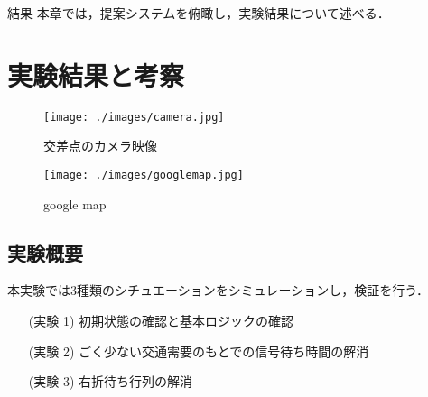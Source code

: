\chapterhead
{結果}
{本章では，提案システムを俯瞰し，実験結果について述べる．}


\section{実験結果と考察}

\begin{figure}[t]
  \texttt{[image: ./images/camera.jpg]}
  \caption{交差点のカメラ映像} 
  \label{tab:camera}
\end{figure}

\begin{figure}[t]
  \texttt{[image: ./images/googlemap.jpg]}
  \caption{google map} 
  \label{tab:googlemap}
\end{figure}

\subsection{実験概要}
本実験では3種類のシチュエーションをシミュレーションし，検証を行う．
\begin{itemize}
  \item[(実験 1)]初期状態の確認と基本ロジックの確認
  \item[(実験 2)]ごく少ない交通需要のもとでの信号待ち時間の解消
  \item[(実験 3)]右折待ち行列の解消
\end{itemize}



\newpage
